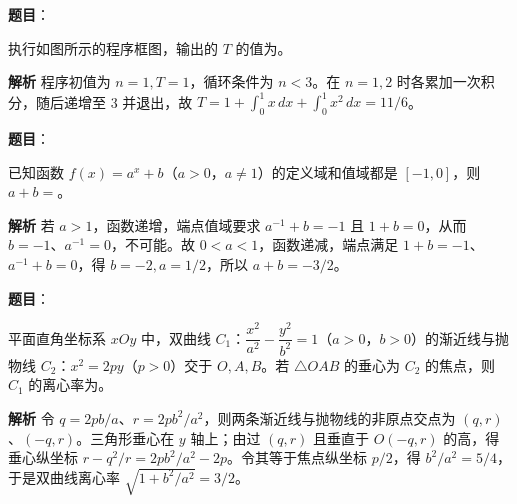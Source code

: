 \begin{answer}

\textbf{题目}：

执行如图所示的程序框图，输出的 $T$ 的值为\gkblank{}。
\nopagebreak[4]
\begin{center}\end{center}
\nopagebreak[4]
\textbf{解析}
程序初值为 $n=1,T=1$，循环条件为 $n<3$。在 $n=1,2$ 时各累加一次积分，随后递增至 3 并退出，故 $T=1+\int_0^1x\,dx+\int_0^1x^2\,dx=11/6$。


\end{answer}
\begin{answer}

\textbf{题目}：

已知函数 $f(x)=a^x+b$（$a>0$，$a\ne 1$）的定义域和值域都是 $[-1,0]$，则 $a+b=$\gkblank{}。

\textbf{解析}
若 $a>1$，函数递增，端点值域要求 $a^{-1}+b=-1$ 且 $1+b=0$，从而 $b=-1$、$a^{-1}=0$，不可能。故 $0<a<1$，函数递减，端点满足 $1+b=-1$、$a^{-1}+b=0$，得 $b=-2,a=1/2$，所以 $a+b=-3/2$。


\end{answer}
\begin{answer}

\textbf{题目}：

平面直角坐标系 $xOy$ 中，双曲线 $C_1$：$\dfrac{x^2}{a^2}-\dfrac{y^2}{b^2}=1$（$a>0$，$b>0$）的渐近线与抛物线 $C_2$：$x^2=2py$（$p>0$）交于 $O,A,B$。若 $\triangle OAB$ 的垂心为 $C_2$ 的焦点，则 $C_1$ 的离心率为\gkblank{}。

\textbf{解析}
令 $q=2pb/a$、$r=2pb^2/a^2$，则两条渐近线与抛物线的非原点交点为 $(q,r)$、$(-q,r)$。三角形垂心在 $y$ 轴上；由过 $(q,r)$ 且垂直于 $O(-q,r)$ 的高，得垂心纵坐标 $r-q^2/r=2pb^2/a^2-2p$。令其等于焦点纵坐标 $p/2$，得 $b^2/a^2=5/4$，于是双曲线离心率 $\sqrt{1+b^2/a^2}=3/2$。


\end{answer}
